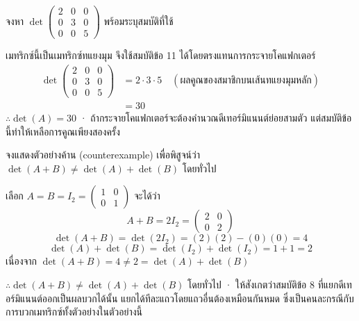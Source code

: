 \begin{ex}
\label{ex:det-diagonal}
จงหา $\det\begin{pmatrix} 2 & 0 & 0 \\ 0 & 3 & 0 \\ 0 & 0 & 5 \end{pmatrix}$ พร้อมระบุสมบัติที่ใช้
\end{ex}
\begin{solution}
เมทริกซ์นี้เป็นเมทริกซ์ทแยงมุม จึงใช้สมบัติข้อ 11 ได้โดยตรงแทนการกระจายโคแฟกเตอร์
\begin{align*}
\det\begin{pmatrix} 2 & 0 & 0 \\ 0 & 3 & 0 \\ 0 & 0 & 5 \end{pmatrix} &= 2 \cdot 3 \cdot 5 \quad (\text{ผลคูณของสมาชิกบนเส้นทแยงมุมหลัก})\\
&= 30
\end{align*}
$\therefore \det(A) = 30$ · ถ้ากระจายโคแฟกเตอร์จะต้องคำนวณดีเทอร์มิแนนต์ย่อยสามตัว แต่สมบัติข้อนี้ทำให้เหลือการคูณเพียงสองครั้ง \solhere
\end{solution}

\begin{ex}
\label{ex:det-add-counterexample}
จงแสดงตัวอย่างค้าน (counterexample) เพื่อพิสูจน์ว่า $\det(A + B) \neq \det(A) + \det(B)$ โดยทั่วไป
\end{ex}
\begin{solution}
เลือก $A = B = I_2 = \begin{pmatrix} 1 & 0 \\ 0 & 1 \end{pmatrix}$
จะได้ว่า
\begin{equation*}
  A + B = 2I_2 = \begin{pmatrix} 2 & 0 \\ 0 & 2 \end{pmatrix}
\end{equation*}
\begin{equation*}
  \det(A + B) = \det(2I_2) = (2)(2) - (0)(0) = 4
\end{equation*}
\begin{equation*}
  \det(A) + \det(B) = \det(I_2) + \det(I_2) = 1 + 1 = 2
\end{equation*}
เนื่องจาก $\det(A + B) = 4 \neq 2 = \det(A) + \det(B)$

$\therefore \det(A + B) \neq \det(A) + \det(B)$ โดยทั่วไป · ให้สังเกตว่าสมบัติข้อ 8 ที่แยกดีเทอร์มิแนนต์ออกเป็นผลบวกได้นั้น แยกได้ทีละแถวโดยแถวอื่นต้องเหมือนกันหมด ซึ่งเป็นคนละกรณีกับการบวกเมทริกซ์ทั้งตัวอย่างในตัวอย่างนี้ \solhere
\end{solution}

